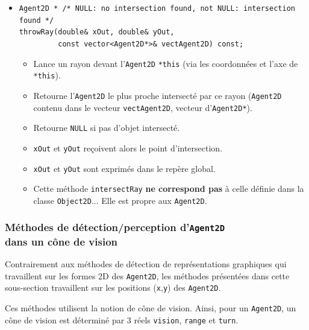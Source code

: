 \documentclass[12pt]{article}
\begin{document}
\begin{itemize}
\item \verb!Agent2D * /* NULL: no intersection found, not NULL: intersection found */! \\
      \verb!throwRay(double& xOut, double& yOut,! \\
      \verb!         const vector<Agent2D*>& vectAgent2D) const;!
      \begin{itemize}
      \item Lance un rayon devant l'{\tt Agent2D} \verb!*this!
      (via les coordonn\'ees et l'axe de \verb!*this!).
      \item Retourne l'{\tt Agent2D} le plus proche intersect\'e par ce rayon
      ({\tt Agent2D} contenu dans le vecteur \verb!vectAgent2D!, 
      vecteur d'{\tt Agent2D*}).
      \item Retourne \verb!NULL! si pas d'objet intersect\'e.
      \item \verb!xOut! et \verb!yOut! re\c coivent alors le point
      d'intersection.
      \item \verb!xOut! et \verb!yOut! sont exprim\'es dans le rep\`ere global.
      \item Cette m\'ethode {\tt intersectRay} {\bf ne correspond pas}
            \`a celle d\'efinie dans la classe {\tt Object2D}...
            Elle est propre aux {\tt Agent2D}.
      \end{itemize}
\end{itemize}

\subsubsection{M\'ethodes de d\'etection/perception d'{\tt Agent2D}\\
dans un c\^one de vision}

Contrairement aux m\'ethodes de d\'etection de repr\'esentations graphiques
qui travaillent sur les formes 2D des {\tt Agent2D},
les m\'ethodes pr\'esent\'ees dans cette sous-section travaillent sur les
positions ({\tt x},{\tt y}) des {\tt Agent2D}.

\vspace{0.3cm}
Ces m\'ethodes utilisent la notion de c\^one de vision.
Ainsi, pour un {\tt Agent2D}, un c\^one de vision est
d\'etermin\'e par 3 r\'eels {\tt vision}, {\tt range} et {\tt turn}.
\end{document}
